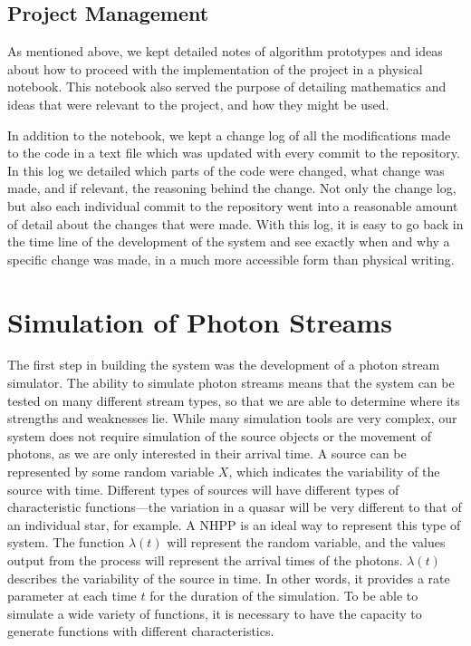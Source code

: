 \documentclass[a4paper,11pt]{article}
\begin{document}
\subsection{Project Management}
\label{sec-4-5}

   As mentioned above, we kept detailed notes of algorithm prototypes and ideas
   about how to proceed with the implementation of the project in a physical
   notebook. This notebook also served the purpose of detailing mathematics and
   ideas that were relevant to the project, and how they might be used. 

   In addition to the notebook, we kept a change log of all the modifications
   made to the code in a text file which was updated with every commit to the
   repository. In this log we detailed which parts of the code were changed,
   what change was made, and if relevant, the reasoning behind the change. Not
   only the change log, but also each individual commit to the repository went
   into a reasonable amount of detail about the changes that were made. With
   this log, it is easy to go back in the time line of the development of the
   system and see exactly when and why a specific change was made, in a much
   more accessible form than physical writing. 
\section{Simulation of Photon Streams}
\label{sec-5}

The first step in building the system was the development of a photon stream
simulator. The ability to simulate photon streams means that the system can be
tested on many different stream types, so that we are able to determine where
its strengths and weaknesses lie. While many simulation tools are very complex,
our system does not require simulation of the source objects or the movement of
photons, as we are only interested in their arrival time. A source can be
represented by some random variable $X$, which indicates the variability of the
source with time. Different types of sources will have different types of
characteristic functions---the variation in a quasar will be very different to
that of an individual star, for example. A NHPP is an ideal way to represent
this type of system. The function $\lambda(t)$ will represent the random
variable, and the values output from the process will represent the arrival
times of the photons. $\lambda(t)$ describes the variability of the source in
time. In other words, it provides a rate parameter at each time $t$ for the
duration of the simulation. To be able to simulate a wide variety of functions,
it is necessary to have the capacity to generate functions with different
characteristics.
\end{document}
